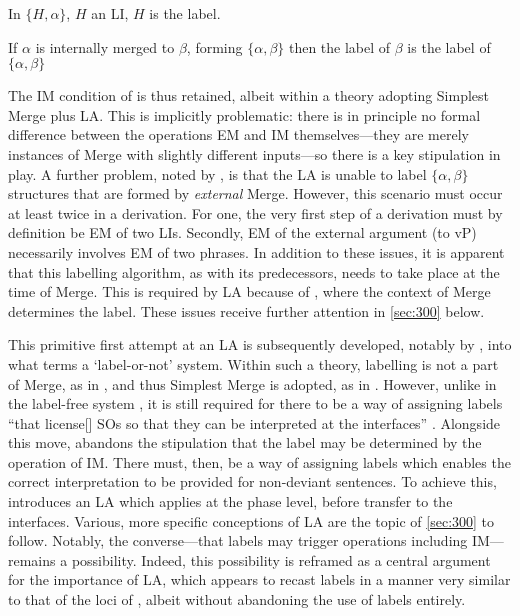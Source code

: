 \begin{subexamples}[preamble={\textit{The Labelling Algorithm of \textcite[145]{ChomskyN_2008}}}]\label{ex:OPlabels}
    \item\label{ex:OPlabels:a} In $\{H,\alpha\}$, $H$ an LI, $H$ is the label.
    \item\label{ex:OPlabels:b} If $\alpha$ is internally merged to $\beta$, forming $\{\alpha,\beta\}$ then the label of $\beta$ is the label of $\{\alpha,\beta\}$
\end{subexamples}
\noindent
The IM condition of \textcite{ChomskyN_2000} is thus retained, albeit within a theory adopting Simplest Merge plus LA. This is implicitly problematic: there is in principle no formal difference between the operations EM and IM themselves---they are merely instances of Merge with slightly different inputs---so there is a key stipulation in play. A further problem, noted by \textcite[f.n.~34]{ChomskyN_2008}, is that the LA  is unable to label $\{\alpha,\beta\}$ structures that are formed by \emph{external} Merge. However, this scenario must occur at least twice in a derivation. For one, the very first step of a derivation must by definition be EM of two LIs. Secondly, EM of the external argument (to vP) necessarily involves EM of two phrases. In addition to these issues, it is apparent that this labelling algorithm, as with its predecessors, needs to take place at the time of Merge. This is required by LA  because of , where the context of Merge determines the label. These issues receive further attention in \autoref{sec:300} below.

This primitive first attempt at an LA is subsequently developed, notably by \textcite{ChomskyN_2013,ChomskyN_2015}, into what \textcite[4]{BoskovicZ_2016a} terms a `label-or-not' system. Within such a theory, labelling is not a part of Merge, as in , and thus Simplest Merge  is adopted, as in \textcite{ChomskyN_2004}. However, unlike in the label-free system \parencite{CollinsC_2002,SeelyTD_2006}, it is still required for there to be a way of assigning labels ``that license[] SOs so that they can be interpreted at the interfaces'' \textcite[43]{ChomskyN_2013}. Alongside this move, \textcite{ChomskyN_2013} abandons the stipulation that the label may be determined by the operation of IM. There must, then, be a way of assigning labels which enables the correct interpretation to be provided for non-deviant sentences. To achieve this, \textcite{ChomskyN_2013} introduces an LA which applies at the phase level, before transfer to the interfaces. Various, more specific conceptions of LA are the topic of \autoref{sec:300} to follow. Notably, the converse---that labels may trigger operations including IM---remains a possibility. Indeed, this possibility is reframed as a central argument for the importance of LA, which appears to recast labels in a manner very similar to that of the loci of \textcite{CollinsC_2002}, albeit without abandoning the use of labels entirely.

